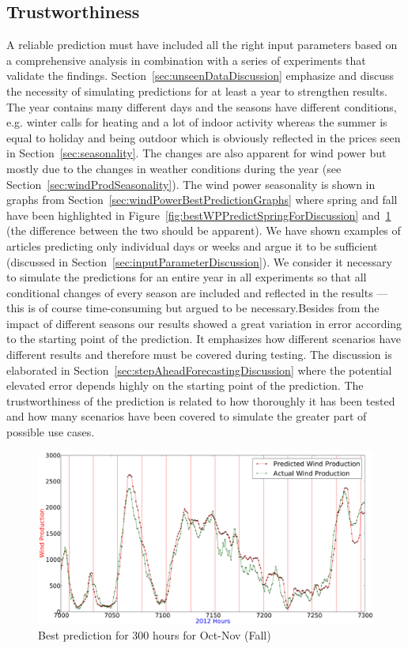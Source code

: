 \subsection{Trustworthiness}
A reliable prediction must have included all the right input parameters based on a comprehensive analysis in combination with a series of experiments that validate the findings. Section~\ref{sec:unseenDataDiscussion} emphasize and discuss the necessity of simulating predictions for at least a year to strengthen results. The year contains many different days and the seasons have different conditions, e.g. winter calls for heating and a lot of indoor activity whereas the summer is equal to holiday and being outdoor which is obviously reflected in the prices seen in Section~\ref{sec:seasonality}. The changes are also apparent for wind power but mostly due to the changes in weather conditions during the year (see Section~\ref{sec:windProdSeasonality}). The wind power seasonality is shown in graphs from Section~\ref{sec:windPowerBestPredictionGraphs} where spring and fall have been highlighted in Figure~\ref{fig:bestWPPredictSpringForDiscussion} and~\ref{fig:bestPredictWPFallForDiscussion} (the difference between the two should be apparent). We have shown examples of articles predicting only individual days or weeks and argue it to be sufficient (discussed in Section~\ref{sec:inputParameterDiscussion}). We consider it necessary to simulate the predictions for an entire year in all experiments so that all conditional changes of every season are included and reflected in the results --- this is of course time-consuming but argued to be necessary.Besides from the impact of different seasons our results showed a great variation in error according to the starting point of the prediction. It emphasizes how different scenarios have different results and therefore must be covered during testing. The discussion is elaborated in Section~\ref{sec:stepAheadForecastingDiscussion} where the potential elevated error depends highly on the starting point of the prediction. The trustworthiness of the prediction is related to how thoroughly it has been tested and how many scenarios have been covered to simulate the greater part of possible use cases. 

\begin{figure}[H]
\centering
\includegraphics[width=0.99\linewidth]{billeder/bestPossiblePredictionWindProduction7000-7300_Fall.png}
\caption{Best prediction for 300 hours for Oct-Nov (Fall)}
\label{fig:bestPredictWPFallForDiscussion}
\end{figure}

